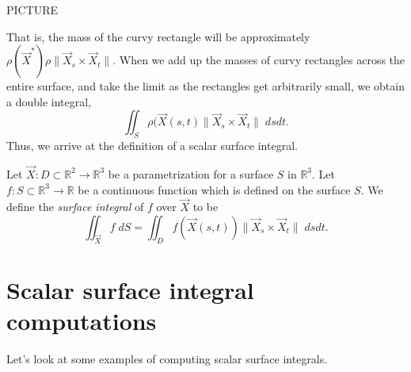 \documentclass{ximera}
\begin{document}
PICTURE

That is, the mass of the curvy rectangle will be approximately $\rho(\vec{X}^*) \rho\|\vec{X}_s\times\vec{X}_t\|$. When we add up the masses of curvy rectangles across the entire surface, and take the limit as the rectangles get arbitrarily small, we obtain a double integral,
\[
\iint_S \rho(\vec{X}(s,t)\|\vec{X}_s\times\vec{X}_t\|\;dsdt.
\]
Thus, we arrive at the definition of a scalar surface integral.

\begin{definition}
Let $\vec{X}:D\subset \mathbb{R}^2\rightarrow\mathbb{R}^3$ be a parametrization for a surface $S$ in $\mathbb{R}^3$. Let $f:S\subset \mathbb{R}^3\rightarrow\mathbb{R}$ be a continuous function which is defined on the surface $S$. We define the \emph{surface integral} of $f$ over $\vec{X}$ to be
\[
\iint_{\vec{X}} f\;dS = \iint_D f(\vec{X}(s,t))\|\vec{X}_s\times\vec{X}_t\|\;dsdt.
\]
\end{definition}

\section*{Scalar surface integral computations}

Let's look at some examples of computing scalar surface integrals.
\end{document}
